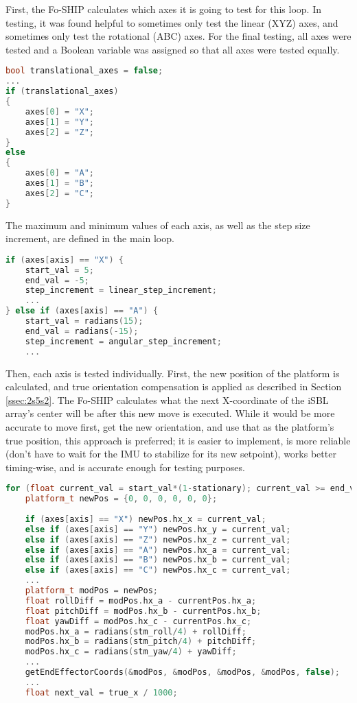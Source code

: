 \documentclass[11pt]{ucthesisCP}
\begin{document}
First, the Fo-SHIP calculates which axes it is going to test for this loop. In testing, it was found helpful to sometimes only test the linear (XYZ) axes, and sometimes only test the rotational (ABC) axes. For the final testing, all axes were tested and a Boolean variable was assigned so that all axes were tested equally. 

\begin{lstlisting}[language=C++]
bool translational_axes = false;
...
if (translational_axes) 
{
	axes[0] = "X";
	axes[1] = "Y";
	axes[2] = "Z";
}
else 
{
	axes[0] = "A";
	axes[1] = "B";
	axes[2] = "C";
}
\end{lstlisting}

The maximum and minimum values of each axis, as well as the step size increment, are defined in the main loop.

\begin{lstlisting}[language=C++]
if (axes[axis] == "X") {
	start_val = 5;
	end_val = -5;
	step_increment = linear_step_increment;
	...
} else if (axes[axis] == "A") {
	start_val = radians(15);
	end_val = radians(-15);
	step_increment = angular_step_increment;
	...
\end{lstlisting}

Then, each axis is tested individually. First, the new position of the platform is calculated, and true orientation compensation is applied as described in Section \ref{ssec:2s5s2}. The Fo-SHIP calculates what the next X-coordinate of the iSBL array’s center will be after this new move is executed. While it would be more accurate to move first, get the new orientation, and use that as the platform’s true position, this approach is preferred; it is easier to implement, is more reliable (don’t have to wait for the IMU to stabilize for its new setpoint), works better timing-wise, and is accurate enough for testing purposes. 

\begin{lstlisting}[language=C++]
for (float current_val = start_val*(1-stationary); current_val >= end_val; current_val -= step_increment*(1-stationary)) {
	platform_t newPos = {0, 0, 0, 0, 0, 0};
	
	if (axes[axis] == "X") newPos.hx_x = current_val;
	else if (axes[axis] == "Y") newPos.hx_y = current_val;
	else if (axes[axis] == "Z") newPos.hx_z = current_val;
	else if (axes[axis] == "A") newPos.hx_a = current_val;
	else if (axes[axis] == "B") newPos.hx_b = current_val;
	else if (axes[axis] == "C") newPos.hx_c = current_val;
	...
	platform_t modPos = newPos;
	float rollDiff = modPos.hx_a - currentPos.hx_a;
	float pitchDiff = modPos.hx_b - currentPos.hx_b;
	float yawDiff = modPos.hx_c - currentPos.hx_c;
	modPos.hx_a = radians(stm_roll/4) + rollDiff;
	modPos.hx_b = radians(stm_pitch/4) + pitchDiff;
	modPos.hx_c = radians(stm_yaw/4) + yawDiff;
	...
	getEndEffectorCoords(&modPos, &modPos, &modPos, &modPos, false);
	...
	float next_val = true_x / 1000;
\end{lstlisting}
\end{document}
